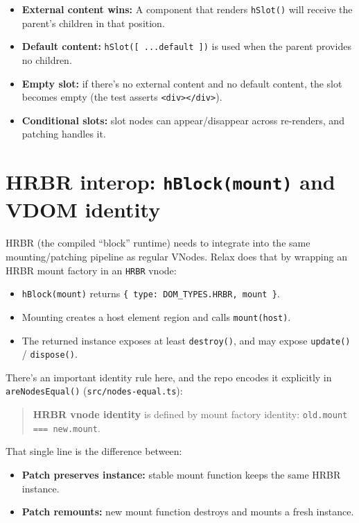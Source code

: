 \begin{itemize}
  \item \textbf{External content wins:} A component that renders \texttt{hSlot()} will receive the parent's children in that position.
  \item \textbf{Default content:} \texttt{hSlot([ ...default ])} is used when the parent provides no children.
  \item \textbf{Empty slot:} if there's no external content and no default content, the slot becomes empty (the test asserts \texttt{<div></div>}).
  \item \textbf{Conditional slots:} slot nodes can appear/disappear across re-renders, and patching handles it.
\end{itemize}

\section{HRBR interop: \texttt{hBlock(mount)} and VDOM identity}
HRBR (the compiled ``block'' runtime) needs to integrate into the same mounting/patching pipeline as regular VNodes. Relax does that by wrapping an HRBR mount factory in an \texttt{HRBR} vnode:

\begin{itemize}
  \item \texttt{hBlock(mount)} returns \texttt{\{ type: DOM\_TYPES.HRBR, mount \}}.
  \item Mounting creates a host element region and calls \texttt{mount(host)}.
  \item The returned instance exposes at least \texttt{destroy()}, and may expose \texttt{update()} / \texttt{dispose()}.
\end{itemize}

There's an important identity rule here, and the repo encodes it explicitly in \texttt{areNodesEqual()} (\texttt{src/nodes-equal.ts}):

\begin{quote}
  	\textbf{HRBR vnode identity} is defined by mount factory identity: \texttt{old.mount === new.mount}.
\end{quote}

That single line is the difference between:

\begin{itemize}
  \item \textbf{Patch preserves instance:} stable mount function keeps the same HRBR instance.
  \item \textbf{Patch remounts:} new mount function destroys and mounts a fresh instance.
\end{itemize}

